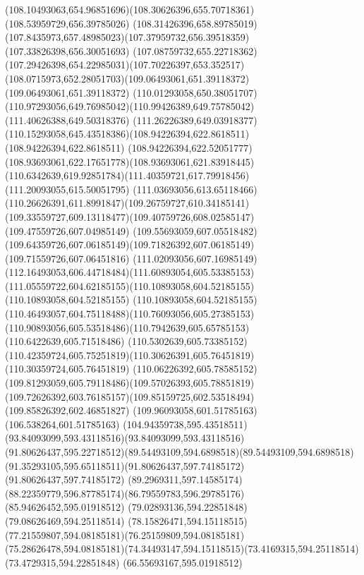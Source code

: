 {{		\curveto(108.10493063,654.96851696)(108.30626396,655.70718361)(108.53959729,656.39785026)
		\lineto(108.31426396,658.89785019)
		\curveto(107.8435973,657.48985023)(107.37959732,656.39518359)(107.33826398,656.30051693)
		\curveto(107.08759732,655.22718362)(107.29426398,654.22985031)(107.70226397,653.352517)
		\curveto(108.0715973,652.28051703)(109.06493061,651.39118372)(109.06493061,651.39118372)
		\curveto(110.01293058,650.38051707)(110.97293056,649.76985042)(110.99426389,649.75785042)
		\lineto(111.40626388,649.50318376)
		\lineto(111.26226389,649.03918377)
		\curveto(110.15293058,645.43518386)(108.94226394,622.8618511)(108.94226394,622.8618511)
		\curveto(108.94226394,622.52051777)(108.93693061,622.17651778)(108.93693061,621.83918445)
		\curveto(110.6342639,619.92851784)(111.40359721,617.79918456)(111.20093055,615.50051795)
		\curveto(111.03693056,613.65118466)(110.26626391,611.8991847)(109.26759727,610.34185141)
		\curveto(109.33559727,609.13118477)(109.40759726,608.02585147)(109.47559726,607.04985149)
		\curveto(109.55693059,607.05518482)(109.64359726,607.06185149)(109.71826392,607.06185149)
		\lineto(109.71559726,607.06451816)
		\curveto(111.02093056,607.16985149)(112.16493053,606.44718484)(111.60893054,605.53385153)
		\curveto(111.05559722,604.62185155)(110.10893058,604.52185155)(110.10893058,604.52185155)
		\curveto(110.10893058,604.52185155)(110.46493057,604.75118488)(110.76093056,605.27385153)
		\curveto(110.90893056,605.53518486)(110.7942639,605.65785153)(110.6422639,605.71518486)
		\curveto(110.5302639,605.73385152)(110.42359724,605.75251819)(110.30626391,605.76451819)
		\lineto(110.30359724,605.76451819)
		\curveto(110.06226392,605.78585152)(109.81293059,605.79118486)(109.57026393,605.78851819)
		\curveto(109.72626392,603.76185157)(109.85159725,602.53518494)(109.85826392,602.46851827)
		\lineto(109.96093058,601.51785163)
		\lineto(106.538264,601.51785163)
		\curveto(104.94359738,595.43518511)(93.84093099,593.43118516)(93.84093099,593.43118516)
		\curveto(91.80626437,595.22718512)(89.54493109,594.6898518)(89.54493109,594.6898518)
		\curveto(91.35293105,595.65118511)(91.80626437,597.74185172)(91.80626437,597.74185172)
		\lineto(89.2969311,597.14585174)
		\curveto(88.22359779,596.87785174)(86.79559783,596.29785176)(85.94626452,595.01918512)
		\lineto(79.02893136,594.22851848)
		\lineto(79.08626469,594.25118514)
		\curveto(78.15826471,594.15118515)(77.21559807,594.08185181)(76.25159809,594.08185181)
		\curveto(75.28626478,594.08185181)(74.34493147,594.15118515)(73.4169315,594.25118514)
		\lineto(73.4729315,594.22851848)
		\lineto(66.55693167,595.01918512)
}}

